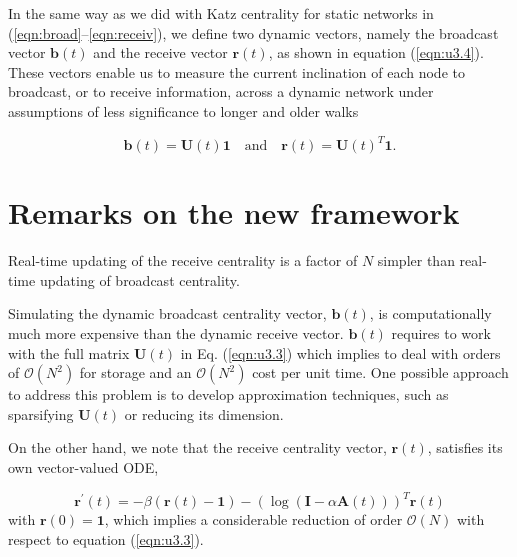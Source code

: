 In the same way as we did with Katz centrality for static networks in (\ref{eqn:broad}--\ref{eqn:receiv}), we define two dynamic vectors, namely the broadcast vector $\mathbf{b}(t)$ and the receive vector $\mathbf{r}(t)$, as shown in equation (\ref{eqn:u3.4}). These vectors enable us to measure the current inclination of each node to broadcast, or to receive information, across a dynamic network under assumptions of less significance to longer and older walks

\begin{equation}
\label{eqn:u3.4}
    \mathbf{b}(t) = \mathbf{U}(t)\mathbf{1} \text{~~~and~~~} \mathbf{r}(t) = \mathbf{U}(t)^T\mathbf{1}.
\end{equation}

\newpage

\section{Remarks on the new framework}
\label{sec:remarks}

\begin{highlightedParagraphC}
 
Real-time updating of the receive centrality is a factor of $N$ simpler than real-time updating of broadcast centrality.

\end{highlightedParagraphC}

Simulating the dynamic broadcast centrality vector, $\mathbf{b}(t)$, is computationally much more expensive than the dynamic receive vector. $\mathbf{b}(t)$ requires to work with the full matrix $\mathbf{U}(t)$ in Eq. (\ref{eqn:u3.3}) which implies to deal with orders of $\mathcal{O}(N^2)$ for storage and an $\mathcal{O}(N^2)$ cost per unit time. One possible approach to address this problem is to develop approximation techniques, such as sparsifying $\mathbf{U}(t)$ or reducing its dimension.

On the other hand, we note that the receive centrality vector, $\mathbf{r}(t)$, satisfies its own vector-valued ODE, 

\begin{equation}
\label{eqn:u4.1}
    \mathbf{r^{\prime}}(t) = -\beta (\mathbf{r}(t) - \mathbf{1}) - (\log (\mathbf{I} - \alpha \mathbf{A}(t)))^T\mathbf{r}(t)
\end{equation} with $\mathbf{r}(0)=\mathbf{1}$, which implies a considerable reduction of order $\mathcal{O}(N)$ with respect to equation (\ref{eqn:u3.3}).

